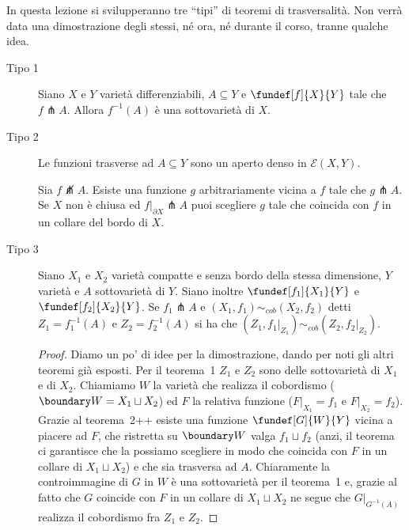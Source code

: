 
In questa lezione si svilupperanno tre ``tipi'' di teoremi di trasversalità. Non verrà data una dimostrazione degli stessi, né ora, né durante il corso, tranne qualche idea.

\begin{description}
\item [Tipo 1] %
\begin{teo}[Teorema 1]
Siano $X$ e $Y$ varietà differenziabili, $A\subseteq Y$ e $\fundef[f]{X}{Y}$  tale che $f\pitchfork A$. Allora $f^{-1}(A)$ è una sottovarietà di $X$.
\end{teo}
\item [Tipo 2] %
\begin{teo}[Teorema 2]
Le funzioni trasverse ad $A\subseteq Y$ sono un aperto denso in $\mathcal E(X,Y)$.
\end{teo}
\begin{teo}[Teorema 2++] \footnotemark %
Sia $f \not\pitchfork A$. Esiste una funzione $g$ arbitrariamente vicina a $f$ tale che $g\pitchfork A$. Se $X$ non è chiusa ed $f|_{\partial X} \pitchfork A$ puoi scegliere $g$ tale che coincida con $f$ in un collare del bordo di $X$.
\end{teo}
\item [Tipo 3] %
\begin{teo}[Teorema 3]
Siano $X_1$ e $X_2$ varietà compatte e senza bordo della stessa dimensione, $Y$ varietà e $A$ sottovarietà di $Y$. Siano inoltre $\fundef[f_1]{X_1}{Y}$ e $\fundef[f_2]{X_2}{Y}$. Se $f_1 \pitchfork A$ e $(X_1,f_1) \sim_{cob} (X_2,f_2)$ detti $Z_1=f_1^{-1}(A)$ e $Z_2=f_2^{-1}(A)$ si ha che $(Z_1, f_1|_{Z_1}) \sim_{cob} (Z_2,f_2|_{Z_2})$.
\end{teo}
\begin{proof}
 Diamo un po' di idee per la dimostrazione, dando per noti gli altri teoremi già esposti. Per il teorema~1 $Z_1$ e $Z_2$ sono delle sottovarietà di $X_1$ e di $X_2$. Chiamiamo $W$ la varietà che realizza il cobordismo ($\boundary W = X_1 \sqcup X_2$) ed $F$ la relativa funzione ($F|_{X_1} = f_1$ e $F|_{X_2}=f_2$). Grazie al teorema~2++ esiste una funzione $\fundef[G]{W}{Y}$ vicina a piacere ad $F$, che ristretta su $\boundary W$ valga $f_1\sqcup f_2$ (anzi, il teorema ci garantisce che la possiamo scegliere in modo che coincida con $F$ in un collare di $X_1\sqcup X_2$) e che sia trasversa ad $A$. Chiaramente la controimmagine di $G$ in $W$ è una sottovarietà per il teorema~1 e, grazie al fatto che $G$ coincide con $F$ in un collare di $X_1 \sqcup X_2$ ne segue che $G|_{G^{-1}(A)}$ realizza il cobordismo fra $Z_1$ e $Z_2$.
 \end{proof}
\end{description}

